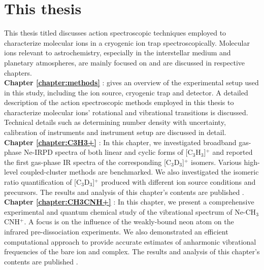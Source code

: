 \section{This thesis}

This thesis titled  discusses action spectroscopic techniques employed to characterize molecular ions in a cryogenic ion trap spectroscopically. Molecular ions relevant to astrochemistry, especially in the interstellar medium and planetary atmospheres, are mainly focused on and are discussed in respective chapters.\\

\textbf{Chapter \ref{chapter:methods}} \emph{}:  gives an overview of the experimental setup used in this study, including the ion source, cryogenic trap and detector. A detailed description of the action spectroscopic methods employed in this thesis to characterize molecular ions' rotational and vibrational transitions is discussed. Technical details such as determining number density with uncertainty, calibration of instruments and instrument setup are discussed in detail.\\

\textbf{Chapter \ref{chapter:C3H3+}} \emph{}: In this chapter, we investigated broadband gas-phase Ne-IRPD spectra of both linear and cyclic forms of [C$_3$H$_3$]$^+$ and reported the first gas-phase IR spectra of the corresponding [C$_3$D$_3$]$^+$ isomers. Various high-level coupled-cluster methods are benchmarked. We also investigated the isomeric ratio quantification of [C$_3$D$_3$]$^+$ produced with different ion source conditions and precursors. The results and analysis of this chapter's contents are published \cite{Marimuthu2020LaboratorySpectroscopy}.\\

\textbf{Chapter \ref{chapter:CH3CNH+}} \emph{}: In this chapter, we present a comprehensive experimental and quantum chemical study of the vibrational spectrum of Ne-CH$_3$CNH$^+$. A focus is on the influence of the weakly-bound neon atom on the infrared pre-dissociation experiments. We also demonstrated an efficient computational approach to provide accurate estimates of anharmonic vibrational frequencies of the bare ion and complex. The results and analysis of this chapter's contents are published \cite{Marimuthu2021InfraredCH3CNH+}.\\

